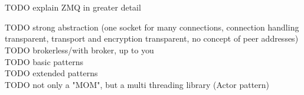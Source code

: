 \chapter{\zmq}\label{ch:zmq}
TODO explain ZMQ in greater detail

TODO strong abstraction (one socket for many connections, connection handling transparent, transport and encryption transparent, no concept of peer addresses)\\
TODO brokerless/with broker, up to you\\
TODO basic patterns\\
TODO extended patterns\\
TODO not only a "MOM", but a multi threading library (Actor pattern)\\
